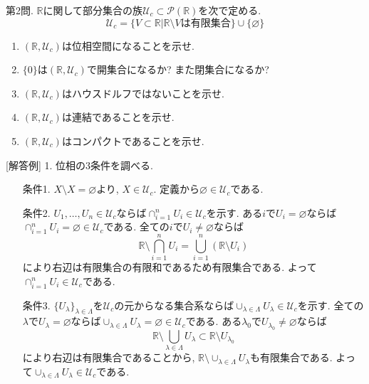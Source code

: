 \documentclass[dvipdfmx,a4paper,11pt]{article}
\newcommand{\R}{\mathbb{R}}
\theoremstyle{definition}
\begin{document}
\newpage
 {\large 第2問.}  $\R$に関して部分集合の族$\mathscr{U}_c \subset \mathcal{P}(\R)$を次で定める.
$$
\mathscr{U}_c = \{V \subset \R | \text{$\R \setminus V$は有限集合} \} \cup \{  \varnothing  \}
$$
	\begin{enumerate}
	\setlength{\parskip}{0cm}
  	\setlength{\itemsep}{0pt} 
	\item $(\R,\mathscr{U}_c)$は位相空間になることを示せ.
	\item $\{ 0 \}$は$(\R,\mathscr{U}_c)$で開集合になるか? また閉集合になるか?
	\item $(\R,\mathscr{U}_c)$はハウスドルフではないことを示せ.
	\item $(\R,\mathscr{U}_c)$は連結であることを示せ.
	\item $(\R,\mathscr{U}_c)$はコンパクトであることを示せ. 
	\end{enumerate}

\vspace{10pt}

[解答例] 1. 位相の3条件を調べる.
	\begin{enumerate}
	\setlength{\parskip}{0cm}
  	\setlength{\itemsep}{0pt} 
\item[条件1.] $X \setminus X = \varnothing$より, $X \in \mathscr{U}_c$. 定義から$\varnothing\in \mathscr{U}_c$である. 
\item[条件2.] $U_1, \ldots, U_n \in \mathscr{U}_c$ならば$\cap_{i=1}^{n} U_{i} \in \mathscr{U}_c$を示す. ある$i$で$U_{i} = \varnothing$ならば$\cap_{i=1}^{n} U_{i} = \varnothing \in  \mathscr{U}_c$である. 全ての$i$で$U_{i} \neq \varnothing$ならば
$$\R \setminus \bigcap_{i=1}^{n} U_{i} = \bigcup_{i=1}^{n}(\R \setminus  U_{i}) $$
により右辺は有限集合の有限和であるため有限集合である. よって$\cap_{i=1}^{n} U_{i} \in \mathscr{U}_c$である.
\item[条件3.] $\{ U_{\lambda}\}_{\lambda \in \Lambda}$を$\mathscr{U}_c$の元からなる集合系ならば$\cup_{\lambda\in \Lambda}U_{\lambda} \in \mathscr{U}_c$を示す.  全ての$\lambda$で$U_{\lambda} =\varnothing$ならば$\cup_{\lambda\in \Lambda}U_{\lambda} = \varnothing \in \mathscr{U}_c$である. ある$\lambda_{0}$で$U_{\lambda_0} \neq \varnothing$ならば
$$\R \setminus \bigcup_{\lambda\in \Lambda}U_{\lambda} \subset  \R \setminus  U_{\lambda_0}  $$
により右辺は有限集合であることから, $\R \setminus \cup_{\lambda\in \Lambda}U_{\lambda}$も有限集合である. 
よって$\cup_{\lambda\in \Lambda}U_{\lambda} \in \mathscr{U}_c$である.
	\end{enumerate}
\end{document}
